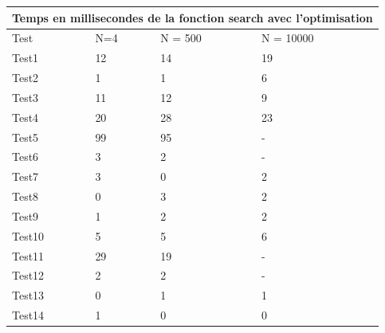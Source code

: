 \documentclass[utf8]{article}
\begin{document}
\begin{large}
\begin{tabular}{ |p{3cm}||p{3cm}|p{3cm}|p{3cm}|  }
        \hline
    \end{tabular}

    \begin{tabular}{ |p{3cm}||p{3cm}|p{3cm}|p{3cm}|  }
        \hline
        \multicolumn{4}{|c|}{Temps en millisecondes de la fonction search avec l'optimisation} \\
        \hline
        Test   & N=4 & N = 500 & N = 10000                                                     \\
        \hline
        Test1  & 12  & 14      & 19                                                            \\
        Test2  & 1   & 1       & 6                                                             \\
        Test3  & 11  & 12      & 9                                                             \\
        Test4  & 20  & 28      & 23                                                            \\
        Test5  & 99  & 95      & -                                                             \\
        Test6  & 3   & 2       & -                                                             \\
        Test7  & 3   & 0       & 2                                                             \\
        Test8  & 0   & 3       & 2                                                             \\
        Test9  & 1   & 2       & 2                                                             \\
        Test10 & 5   & 5       & 6                                                             \\
        Test11 & 29  & 19      & -                                                             \\
        Test12 & 2   & 2       & -                                                             \\
        Test13 & 0   & 1       & 1                                                             \\
        Test14 & 1   & 0       & 0                                                             \\
        \hline
    \end{tabular}




\end{large}
\end{document}
